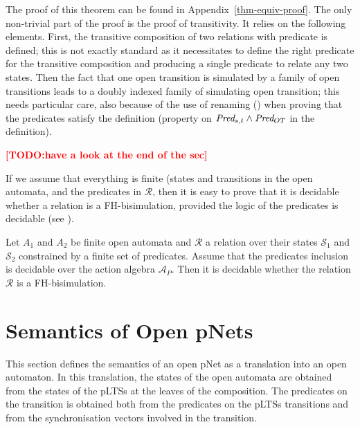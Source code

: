 \documentclass{lncs/llncs}
\newcommand{\TODO}[1]{\textcolor{red}{\textbf{[TODO:#1]}}}
\begin{document}
The proof of this theorem can be found in Appendix~\ref{thm-equiv-proof}. The only non-trivial part of the proof is the proof of transitivity. It relies on the following elements. First,  the transitive composition of two relations with predicate is defined; this is not exactly standard as it necessitates to define the right predicate for the transitive composition and producing a single predicate to relate any two states. Then the fact that one open transition is simulated by a family of open transitions leads to a doubly indexed family of simulating open transition; this needs particular care, also because of the use of renaming (\Post) when proving that the predicates satisfy the definition (property on $\Pred_{s,t} \land \Pred_{OT}$ in the definition). 

\TODO{have a look at the end of the sec}

\medskip

If we assume that everything is finite (states and transitions in the
open automata, and the predicates in $\mathcal{R}$, then it is easy to
prove that it is decidable whether a relation is a 
FH-bisimulation, provided the logic of the predicates is decidable (see \cite{henrio:Forte2016}).



\begin{theorem}
Let $A_1$ and $A_2$ be finite open automata
and $\mathcal{R}$ a relation over their states $\mathcal{S}_1$ and
$\mathcal{S}_2$ constrained by a finite set of predicates. Assume that
the predicates inclusion is decidable over  
the action algebra $\mathcal{A}_P$. Then it is decidable whether the relation 
$\mathcal{R}$ is a FH-bisimulation.
  
\end{theorem}



\section{Semantics of Open pNets}
\label{section:op-semantics}

This section defines the semantics of an open pNet as a translation into an open automaton. 
In this translation, the states of the open automata are obtained from the states of the pLTSs at the leaves of the composition. The predicates on the transition is obtained both from the predicates on the pLTSs transitions and from the synchronisation vectors involved in the transition.
\end{document}
